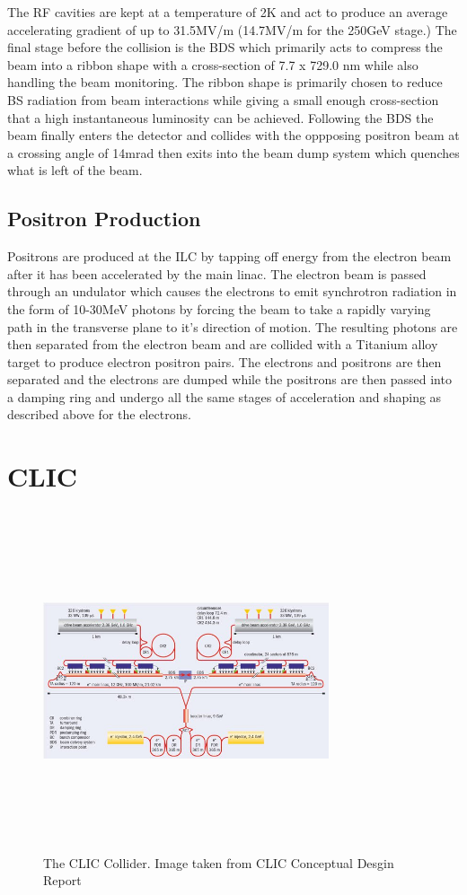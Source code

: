 The \ac{RF} cavities are kept at a temperature of 2K and act to produce an average accelerating gradient of up to 31.5MV/m (14.7MV/m for the 250GeV stage.)  The final stage before the collision is the \ac{BDS} which primarily acts to compress the beam into a ribbon shape with a cross-section of 7.7 x 729.0 nm while also handling the beam monitoring. The ribbon shape is primarily chosen to reduce \ac{BS} radiation from beam interactions while giving a small enough cross-section that a high instantaneous luminosity can be achieved. Following the \ac{BDS} the beam finally enters the detector and collides with the oppposing positron beam at a crossing angle of 14mrad then exits into the beam dump system which quenches what is left of the beam.

\subsection{Positron Production}
Positrons are produced at the \ac{ILC} by tapping off energy from the electron beam after it has been accelerated by the main linac. The electron beam is passed through an undulator which causes the electrons to emit synchrotron radiation in the form of 10-30MeV photons by forcing the beam to take a rapidly varying path in the transverse plane to it's direction of motion. The resulting photons are then separated from the electron beam and are collided with a Titanium alloy target to produce electron positron pairs. The electrons and positrons are then separated and the electrons are dumped while the positrons are then passed into a damping ring and undergo all the same stages of acceleration and shaping as described above for the electrons.

\section{CLIC}

\begin{figure}
  \centering
  \includegraphics[width=0.75\textwidth,height=10cm,keepaspectratio]{Experiments/fig/clic}
  \caption[The CLIC Experiment]{The CLIC Collider. Image taken from CLIC Conceptual Desgin Report\cite{CDR}}
  \label{Fig:CLIC}
\end{figure}

